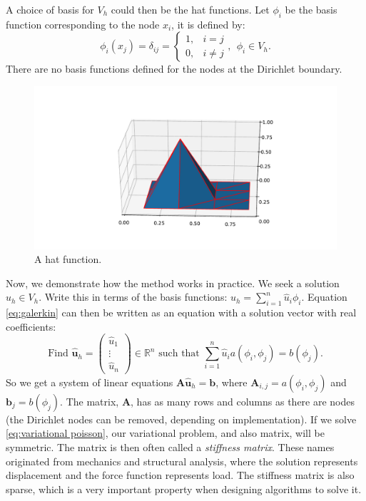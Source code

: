 \documentclass[../Main/main.tex]{subfiles}
\begin{document}
	A choice of basis for $V_h$ could then be the hat functions.  Let $\phi_i$ be the basis function corresponding to the node $x_i$, it is defined by:
	\begin{equation*}
		\phi_i(x_j) = \delta_{ij}=\left\{\begin{matrix}
			1, &i=j \\ 
			0, &i\neq j 
		\end{matrix}\right., \ \ \phi_i \in V_h.
	\end{equation*}
	There are no basis functions defined for the nodes at the Dirichlet boundary.
	\begin{figure}[H]
		\centering
		\includegraphics[width=1\textwidth]{hat_function_python_plot_2.pdf}
		\caption{A hat function.}
		\label{fig:hat1}
	\end{figure}
	Now, we demonstrate how the method works in practice. We seek a solution $u_h \in V_h$. Write this in terms of the basis functions: $u_h = \sum_{i=1}^n \hat{u}_i \phi_i$. Equation \eqref{eq:galerkin} can then be written as an equation with a solution vector with real coefficients:
	\begin{equation}\label{eq:fem system}
			\text{Find }\hat{\bm{u}}_h=\begin{pmatrix}
				\hat{u}_1\\ 
				\vdots \\ 
				\hat{u}_n
			\end{pmatrix}\in \mathbb{R}^n \text{ such that }\sum_{i=1}^n \hat{u}_i  a(\phi_i,\phi_j) = b(\phi_j).
	\end{equation}
	So we get a system of linear equations $\bm{A}\hat{\bm{u}}_h = \bm{b}$, where $\bm{A}_{i,j}=a(\phi_i,\phi_j)$ and $\bm{b}_j = b(\phi_j)$. The matrix, $\bm{A}$, has as many rows and columns as there are nodes (the Dirichlet nodes can be removed, depending on implementation). If we solve \eqref{eq:variational poisson}, our variational problem, and also matrix, will be symmetric. The matrix is then often called a \emph{stiffness matrix}. These names originated from mechanics and structural analysis, where the solution represents displacement and the force function represents load. The stiffness matrix is also sparse, which is a very important property when designing algorithms to solve it.\par
\end{document}
